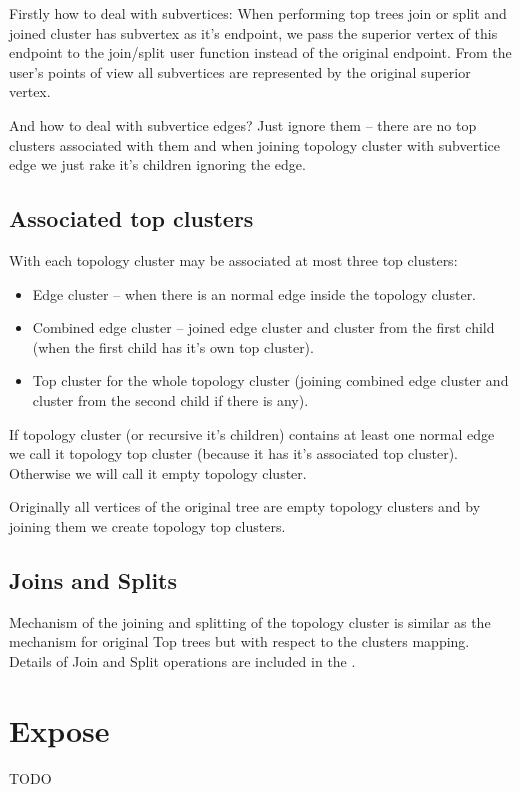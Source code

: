 Firstly how to deal with subvertices: When performing top trees join or split
and joined cluster has subvertex as it's endpoint, we pass the superior vertex
of this endpoint to the join/split user function instead of the original
endpoint. From the user's points of view all subvertices are represented by the
original superior vertex.

And how to deal with subvertice edges? Just ignore them -- there are no top
clusters associated with them and when joining topology cluster with subvertice
edge we just rake it's children ignoring the edge.

\subsection{Associated top clusters}

With each topology cluster may be associated at most three top clusters:
\begin{itemize}
\item {\I Edge cluster} -- when there is an normal edge inside the topology cluster.
\item {\I Combined edge cluster} -- joined {\I edge cluster} and cluster from
the first child (when the first child has it's own top cluster).
\item {\I Top cluster} for the whole topology cluster (joining {\I combined edge
cluster} and cluster from the second child if there is any).
\end{itemize}

If topology cluster (or recursive it's children) contains at least one normal
edge we call it {\I topology top cluster} (because it has it's associated top
cluster). Otherwise we will call it {\I empty topology cluster}.

Originally all vertices of the original tree are empty topology clusters and by
joining them we create topology top clusters.

\subsection{Joins and Splits}

Mechanism of the joining and splitting of the topology cluster is similar as the
mechanism for original Top trees but with respect to the clusters mapping.
Details of Join and Split operations are included in the .

\section{Expose}


TODO
